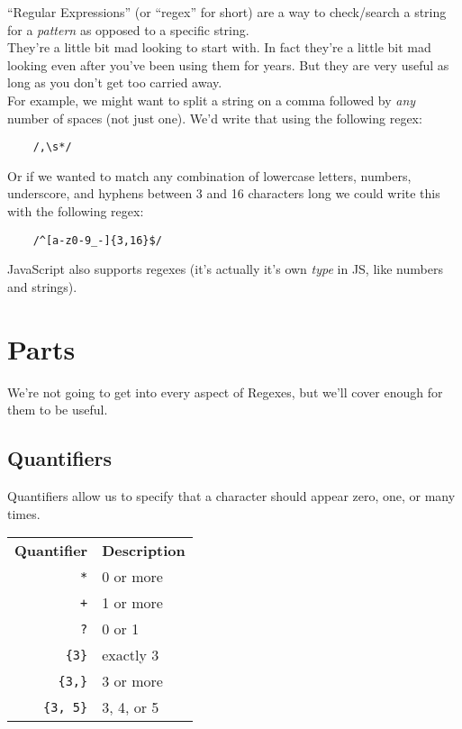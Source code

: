 ``Regular Expressions'' (or ``regex'' for short) are a way to check/search a string for a \textit{pattern} as opposed to a specific string.
\\

They're a little bit mad looking to start with. In fact they're a little bit mad looking even after you've been using them for years. But they are very useful as long as you don't get too carried away.
\\

For example, we might want to split a string on a comma followed by \textit{any} number of spaces (not just one). We'd write that using the following regex:

\begin{verbatim}
    /,\s*/
\end{verbatim}


Or if we wanted to match any combination of lowercase letters, numbers, underscore, and hyphens between 3 and 16 characters long we could write this with the following regex:

\begin{verbatim}
    /^[a-z0-9_-]{3,16}$/
\end{verbatim}

JavaScript also supports regexes (it's actually it's own \textit{type} in JS, like numbers and strings).

\pagebreak


\section{Parts}

We're not going to get into every aspect of Regexes, but we'll cover enough for them to be useful.


\subsection{Quantifiers}

Quantifiers allow us to specify that a character should appear zero, one, or many times.
\\

\begin{small}
    \begin{tabu}{r X}
        \textbf{Quantifier}   & \textbf{Description} \\
        \texttt{*}          & 0 or more \\
        \texttt{+}          & 1 or more \\
        \texttt{?}          & 0 or 1 \\
        \texttt{\{3\}}      & exactly 3 \\
        \texttt{\{3,\}}     & 3 or more \\
        \texttt{\{3, 5\}}   & 3, 4, or 5
    \end{tabu}
\end{small}

